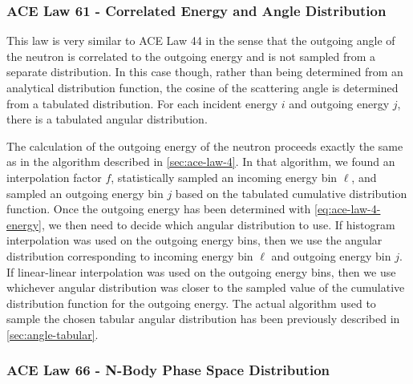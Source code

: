 \subsubsection{ACE Law 61 - Correlated Energy and Angle Distribution}

This law is very similar to ACE Law 44 in the sense that the outgoing angle of
the neutron is correlated to the outgoing energy and is not sampled from a
separate distribution. In this case though, rather than being determined from an
analytical distribution function, the cosine of the scattering angle is
determined from a tabulated distribution. For each incident energy $i$ and
outgoing energy $j$, there is a tabulated angular distribution.

The calculation of the outgoing energy of the neutron proceeds exactly the same
as in the algorithm described in \autoref{sec:ace-law-4}. In that algorithm, we
found an interpolation factor $f$, statistically sampled an incoming energy bin
$\ell$, and sampled an outgoing energy bin $j$ based on the tabulated cumulative
distribution function. Once the outgoing energy has been determined with
\eqref{eq:ace-law-4-energy}, we then need to decide which angular distribution
to use. If histogram interpolation was used on the outgoing energy bins, then we
use the angular distribution corresponding to incoming energy bin $\ell$ and
outgoing energy bin $j$. If linear-linear interpolation was used on the outgoing
energy bins, then we use whichever angular distribution was closer to the
sampled value of the cumulative distribution function for the outgoing
energy. The actual algorithm used to sample the chosen tabular angular
distribution has been previously described in \autoref{sec:angle-tabular}.

\subsubsection{ACE Law 66 - N-Body Phase Space Distribution}

